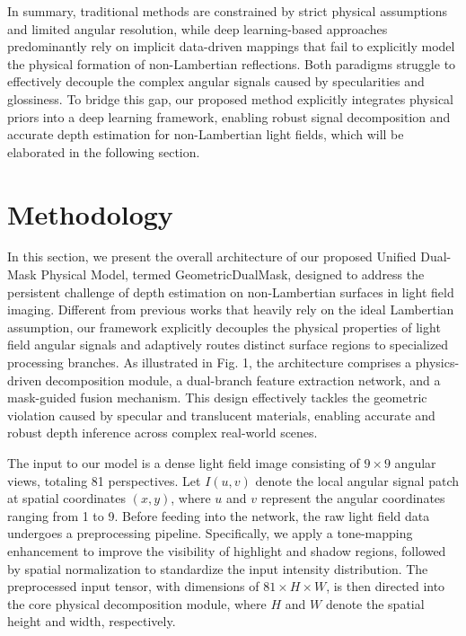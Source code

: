 \documentclass[lettersize,journal]{IEEEtran}
\begin{document}
In summary, traditional methods are constrained by strict physical assumptions and limited angular resolution, while deep learning-based approaches predominantly rely on implicit data-driven mappings that fail to explicitly model the physical formation of non-Lambertian reflections. Both paradigms struggle to effectively decouple the complex angular signals caused by specularities and glossiness. To bridge this gap, our proposed method explicitly integrates physical priors into a deep learning framework, enabling robust signal decomposition and accurate depth estimation for non-Lambertian light fields, which will be elaborated in the following section.

\section{Methodology}

In this section, we present the overall architecture of our proposed Unified Dual-Mask Physical Model, termed GeometricDualMask, designed to address the persistent challenge of depth estimation on non-Lambertian surfaces in light field imaging. Different from previous works that heavily rely on the ideal Lambertian assumption, our framework explicitly decouples the physical properties of light field angular signals and adaptively routes distinct surface regions to specialized processing branches. As illustrated in Fig. 1, the architecture comprises a physics-driven decomposition module, a dual-branch feature extraction network, and a mask-guided fusion mechanism. This design effectively tackles the geometric violation caused by specular and translucent materials, enabling accurate and robust depth inference across complex real-world scenes.

The input to our model is a dense light field image consisting of $9 \times 9$ angular views, totaling 81 perspectives. Let $I(u,v)$ denote the local angular signal patch at spatial coordinates $(x,y)$, where $u$ and $v$ represent the angular coordinates ranging from 1 to 9. Before feeding into the network, the raw light field data undergoes a preprocessing pipeline. Specifically, we apply a tone-mapping enhancement  to improve the visibility of highlight and shadow regions, followed by spatial normalization to standardize the input intensity distribution. The preprocessed input tensor, with dimensions of $81 \times H \times W$, is then directed into the core physical decomposition module, where $H$ and $W$ denote the spatial height and width, respectively.
\end{document}
